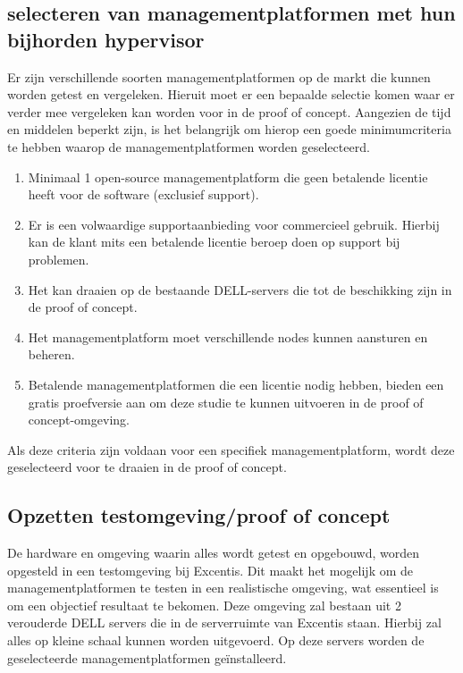 \subsection{selecteren van managementplatformen met hun bijhorden hypervisor}
Er zijn verschillende soorten managementplatformen op de markt die kunnen worden getest en vergeleken. Hieruit moet er een bepaalde selectie komen waar er verder mee vergeleken kan worden voor in de proof of concept.
Aangezien de tijd en middelen beperkt zijn, is het belangrijk om hierop een goede minimumcriteria te hebben waarop de managementplatformen worden geselecteerd.

\begin{enumerate}
\item Minimaal 1 open-source managementplatform die geen betalende licentie heeft voor de software (exclusief support).
\item Er is een volwaardige supportaanbieding voor commercieel gebruik. Hierbij kan de klant mits een betalende licentie beroep doen op support bij problemen.
\item Het kan draaien op de bestaande DELL-servers die tot de beschikking zijn in de proof of concept.
\item Het managementplatform moet verschillende nodes kunnen aansturen en beheren.
\item Betalende managementplatformen die een licentie nodig hebben, bieden een gratis proefversie aan om deze studie te kunnen uitvoeren in de proof of concept-omgeving.
\end{enumerate}

Als deze criteria zijn voldaan voor een specifiek managementplatform, wordt deze geselecteerd voor te draaien in de proof of concept.

\subsection{Opzetten testomgeving/proof of concept}
De hardware en omgeving waarin alles wordt getest en opgebouwd, worden opgesteld in een testomgeving bij Excentis. Dit maakt het mogelijk om de managementplatformen te testen in een realistische omgeving, wat essentieel is om een objectief resultaat te bekomen.
Deze omgeving zal bestaan uit 2 verouderde DELL servers die in de serverruimte van Excentis staan. Hierbij zal alles op kleine schaal kunnen worden uitgevoerd.
Op deze servers worden de geselecteerde managementplatformen geïnstalleerd.
